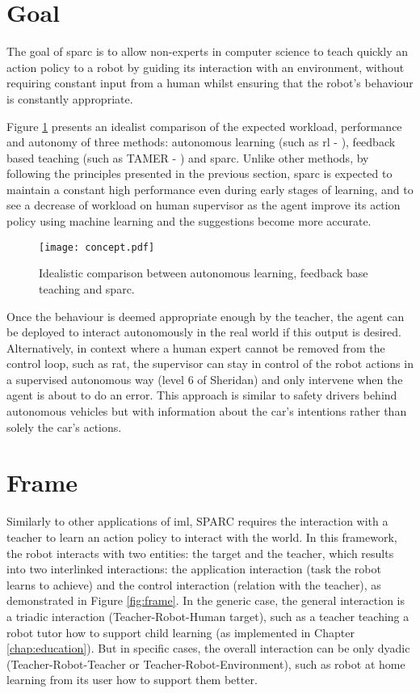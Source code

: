 \section{Goal}

The goal of \gls{sparc} is to allow non-experts in computer science to teach quickly an action policy to a robot by guiding its interaction with an environment, without requiring constant input from a human whilst ensuring that the robot's behaviour is constantly appropriate. 

Figure \ref{fig:concept} presents an idealist comparison of the expected workload, performance and autonomy of three methods: autonomous learning (such as \gls{rl} - \citealt{sutton1998reinforcement}), feedback based teaching (such as TAMER - \citealt{knox2009interactively}) and \gls{sparc}. Unlike other methods, by following the principles presented in the previous section, \gls{sparc} is expected to maintain a constant high performance even during early stages of learning, and to see a decrease of workload on human supervisor as the agent improve its action policy using machine learning and the suggestions become more accurate.

\begin{figure}[ht]
	\texttt{[image: concept.pdf]}
	\centering
	\caption{Idealistic comparison between autonomous learning, feedback base teaching and \gls{sparc}.}
	\label{fig:concept}
\end{figure}

Once the behaviour is deemed appropriate enough by the teacher, the agent can be deployed to interact autonomously in the real world if this output is desired. Alternatively, in context where a human expert cannot be removed from the control loop, such as \acrlong{rat}, the supervisor can stay in control of the robot actions in a supervised autonomous way (level 6 of Sheridan) and only intervene when the agent is about to do an error. This approach is similar to safety drivers behind autonomous vehicles but with information about the car's intentions rather than solely the car's actions. 

\section{Frame}

Similarly to other applications of \gls{iml}, SPARC requires the interaction with a teacher to learn an action policy to interact with the world. In this framework, the robot interacts with two entities: the target and the teacher, which results into two interlinked interactions: the application interaction (task the robot learns to achieve) and the control interaction (relation with the teacher), as demonstrated in Figure \ref{fig:frame}. In the generic case, the general interaction is a triadic interaction (Teacher-Robot-Human target), such as a teacher teaching a robot tutor how to support child learning (as implemented in Chapter \ref{chap:education}). But in specific cases, the overall interaction can be only dyadic (Teacher-Robot-Teacher or Teacher-Robot-Environment), such as  robot at home learning from its user how to support them better.


